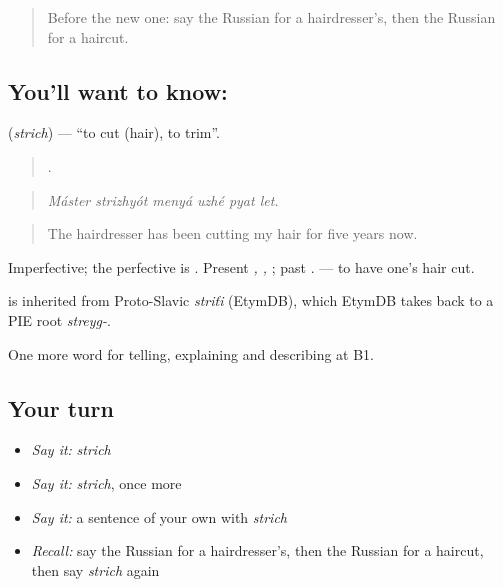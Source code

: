 \begin{quote}
Before the new one: say the Russian for a hairdresser's, then the Russian for a haircut.
\end{quote}

\subsection*{You'll want to know: }
\textbf{} (\emph{strich}) — \textquotedblleft{}to cut (hair), to trim\textquotedblright{}.

\begin{quote}
     .
\end{quote}

\begin{quote}
\emph{Máster strizhyót menyá uzhé pyat let.}
\end{quote}

\begin{quote}
The hairdresser has been cutting my hair for five years now.
\end{quote}

Imperfective; the perfective is \emph{}. Present \emph{, , }; past \emph{}. \emph{} — to have one's hair cut.

\begin{cousinweb}
\emph{} is inherited from Proto-Slavic \emph{striťi} (EtymDB), which EtymDB takes back to a PIE root \emph{streyg-}.
\end{cousinweb}

\begin{grammarlens}[title={What you've built}]
One more word for telling, explaining and describing at B1.
\end{grammarlens}

\subsection*{Your turn}
\begin{itemize}
\raggedright
  \item \emph{Say it:} \emph{strich}
  \item \emph{Say it:} \emph{strich}, once more
  \item \emph{Say it:} a sentence of your own with \emph{strich}
  \item \emph{Recall:} say the Russian for a hairdresser's, then the Russian for a haircut, then say \emph{strich} again
\end{itemize}

